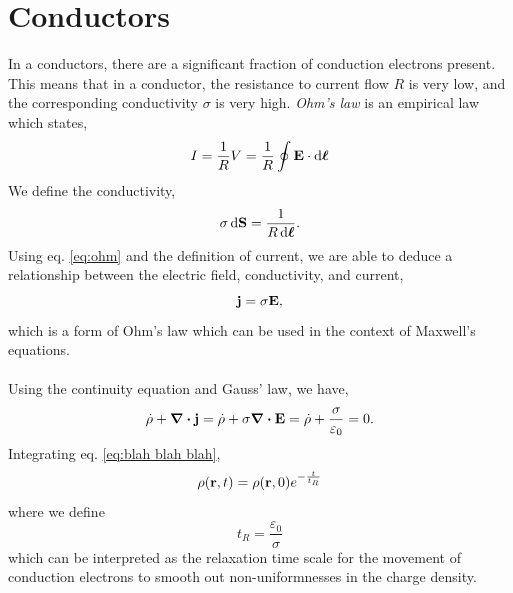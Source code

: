 \documentclass{book}
\begin{document}
\section{Conductors}
In a conductors, there are a significant fraction of conduction electrons present. This means that in a conductor, the resistance to current flow $R$ is very low, and the corresponding conductivity $\sigma$ is very high. \textit{Ohm's law} is an empirical law which states,
\begin{equation}
	I = \frac{1}{R}V = \frac{1}{R}\oint\vb{E}\cdot\dd{\vb*{\ell}} \label{eq:ohm}
\end{equation}
We define the conductivity,
\begin{equation}
	\sigma \dd{\vb{S}} = \frac{1}{R\dd{\vb*{\ell}}}.
\end{equation}
Using eq. \eqref{eq:ohm} and the definition of current, we are able to deduce a relationship between the electric field, conductivity, and current,
\begin{equation}
	\vb{j} = \sigma \vb{E},
\end{equation}
which is a form of Ohm's law which can be used in the context of Maxwell's equations.
\\\\
Using the continuity equation and Gauss' law, we have,
\begin{equation}
	\Dot{\rho} + \div{\vb{j}} = \Dot{\rho} + \sigma\div{\vb{E}} = \Dot{\rho} + \frac{\sigma}{\varepsilon_0} = 0. \label{eq:blah blah blah}
\end{equation}
Integrating eq. \eqref{eq:blah blah blah}, 
\begin{equation}
	\rho(\vb{r},t) = \rho(\vb{r}, 0)e^{-\frac{t}{t_R}}
\end{equation}
where we define
\begin{equation}
	t_R = \frac{\varepsilon_0}{\sigma}
\end{equation}
which can be interpreted as the relaxation time scale for the movement of conduction electrons to smooth out non-uniformnesses in the charge density.
\end{document}
